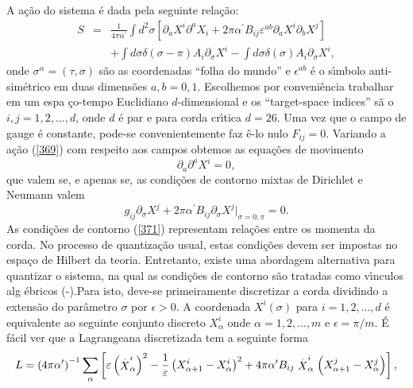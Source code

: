 \documentclass[a4paper,thmsa,12pt]{report}
\begin{document}
A a\c{c}\~{a}o do sistema \'{e} dada pela seguinte rela\c{c}\~{a}o: 
\begin{eqnarray}
S &=&\frac{1}{4\pi \alpha ^{\prime }}\int d^{2}\sigma \left[ \partial
_{a}X^{i}\partial ^{a}X_{i}+2\pi \alpha ^{\prime }B_{ij}\varepsilon
^{ab}\partial _{a}X^{i}\partial _{b}X^{j}\right]   \nonumber \\
&&+\int d\sigma \delta (\sigma -\pi )A_{i}\partial _{\sigma }X^{i}-\int
d\sigma \delta (\sigma )A_{i}\partial _{\sigma }X^{i},  \label{369}
\end{eqnarray}
onde $\sigma ^{\alpha }=(\tau ,\sigma )$ s\~{a}o as coordenadas ``folha do
mundo'' e $\epsilon ^{ab}$ \'{e} o s\'{\i}mbolo anti-sim\'{e}trico em duas
dimens\~{o}es $a,b=0,1$. Escolhemos por conveni\^{e}ncia trabalhar em um espa%
\c{c}o-tempo Euclidiano $d$-dimensional e os ``target-space indices'' s\~{a}%
o $i,j=1,2,\ldots ,d$, onde $d$ \'{e} par e para corda cr\'{\i}tica $d=26$.
Uma vez que o campo de gauge \'{e} constante, pode-se convenientemente faz%
\^{e}-lo nulo $F_{ij}=0$. Variando a a\c{c}\~{a}o (\ref{369}) com respeito
aos campos obtemos as equa\c{c}\~{o}es de movimento 
\begin{equation}
\partial _{a}\partial ^{a}X^{i}=0,  \label{370}
\end{equation}
que valem se, e apenas se, as condi\c{c}\~{o}es de contorno mixtas de
Dirichlet e Neumann valem 
\begin{equation}
g_{ij}\partial _{\sigma }X^{j}+2\pi \alpha ^{\prime }B_{ij}\partial _{\sigma
}X^{j}|_{\sigma =0,\pi }=0.  \label{371}
\end{equation}
As condi\c{c}\~{o}es de contorno (\ref{371}) representam rela\c{c}\~{o}es
entre os momenta da corda. No processo de quantiza\c{c}\~{a}o usual, estas
condi\c{c}\~{o}es devem ser impostas no espa\c{c}o de Hilbert da teoria.
Entretanto, existe uma abordagem alternativa para quantizar o sistema, na
qual as condi\c{c}\~{o}es de contorno s\~{a}o tratadas como v\'{\i}nculos alg%
\'{e}bricos (\cite{ardalan1}-\cite{chu1}).Para isto, deve-se primeiramente
discretizar a corda dividindo a extens\~{a}o do par\^{a}metro $\sigma $ por $%
\epsilon >0$. A coordenada $X^{i}(\sigma )$ para $i=1,2,\ldots ,d$ \'{e}
equivalente ao seguinte conjunto discreto $X_{\alpha }^{i}$ onde $\alpha
=1,2,\ldots ,m$ e $\epsilon =\pi /m$. \'{E} f\'{a}cil ver que a Lagrangeana
discretizada tem a seguinte forma 
\begin{equation}
L=\left( 4\pi \alpha ^{\prime }\right) ^{-1}\sum\limits_{\alpha }\left[
\varepsilon \left( \stackrel{.}{X}_{\alpha }^{i}\right) ^{2}-\frac{1}{%
\varepsilon }\left( X_{\alpha +1}^{i}-X_{\alpha }^{i}\right) ^{2}+4\pi
\alpha ^{\prime }B_{ij}\stackrel{.}{X}_{\alpha }^{i}\left( X_{\alpha
+1}^{j}-X_{\alpha }^{j}\right) \right] ,  \label{372}
\end{equation}
\end{document}
